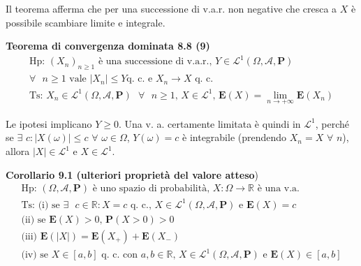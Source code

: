 \documentclass{article}
\begin{document}
Il teorema afferma che per una successione di v.a.r. non negative che cresca
a $X$ \`{e} possibile scambiare limite e integrale.

\textbf{Teorema di convergenza dominata 8.8 (9)}%
\begin{gather*}
\text{Hp: }\left( X_{n}\right) _{n\geq 1}\text{ \`{e} una successione di
v.a.r., }Y\in \mathcal{L}^{1}\left( \Omega ,\mathcal{A},\mathbf{P}\right) \\
\forall \text{ }n\geq 1\text{ vale }\left\vert X_{n}\right\vert \leq Y\text{
q. c. e }X_{n}\rightarrow X\text{ q. c.} \\
\text{Ts: }X_{n}\in \mathcal{L}^{1}\left( \Omega ,\mathcal{A},\mathbf{P}%
\right) \text{ }\forall \text{ }n\geq 1\text{, }X\in \mathcal{L}^{1}\text{, }%
\mathbf{E}\left( X\right) =\lim_{n\rightarrow +\infty }\mathbf{E}\left(
X_{n}\right)
\end{gather*}

Le ipotesi implicano $Y\geq 0$. Una v. a. certamente limitata \`{e} quindi
in $\mathcal{L}^{1}$, perch\'{e} se $\exists $ $c:\left\vert X\left( \omega
\right) \right\vert \leq c$ $\forall $ $\omega \in \Omega $, $Y\left( \omega
\right) =c$ \`{e} integrabile (prendendo $X_{n}=X$ $\forall $ $n$), allora $%
\left\vert X\right\vert \in \mathcal{L}^{1}$ e $X\in \mathcal{L}^{1}$.

\textbf{Corollario 9.1 (ulteriori propriet\`{a} del valore atteso})%
\begin{gather*}
\text{Hp: }\left( \Omega ,\mathcal{A},\mathbf{P}\right) \text{ \`{e} uno
spazio di probabilit\`{a}, }X:\Omega \rightarrow 
\mathbb{R}
\text{ \`{e} una v.a.} \\
\text{Ts: (i) se }\exists \text{ }c\in 
\mathbb{R}
:X=c\text{ q. c., }X\in \mathcal{L}^{1}\left( \Omega ,\mathcal{A},\mathbf{P}%
\right) \text{ e }\mathbf{E}\left( X\right) =c \\
\text{(ii) se }\mathbf{E}\left( X\right) >0\text{, }\mathbf{P}\left(
X>0\right) >0 \\
\text{(iii) }\mathbf{E}\left( \left\vert X\right\vert \right) =\mathbf{E}%
\left( X_{+}\right) +\mathbf{E}\left( X_{-}\right) \\
\text{(iv) se }X\in \left[ a,b\right] \text{ q. c. con }a,b\in 
\mathbb{R}
\text{, }X\in \mathcal{L}^{1}\left( \Omega ,\mathcal{A},\mathbf{P}\right) 
\text{ e }\mathbf{E}\left( X\right) \in \left[ a,b\right]
\end{gather*}
\end{document}
